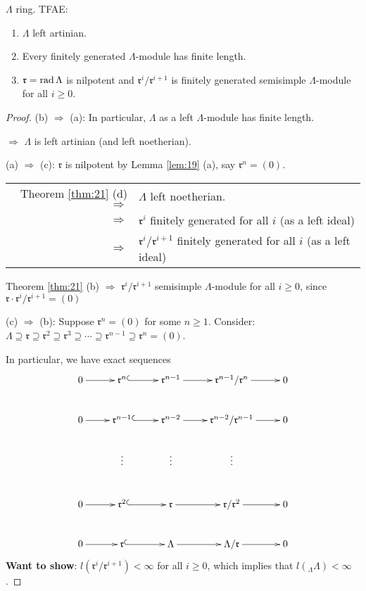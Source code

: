 \begin{cor}\label{cor:22}
$\Lambda$ ring. TFAE:
\begin{enumerate}[\rm(a)]
\item $\Lambda$ left artinian.
\item Every finitely generated $\Lambda$-module has finite length.
\item $\mathfrak{r} = \operatorname{rad}\nolimits\Lambda$ is nilpotent and
  $\mathfrak{r}^i/\mathfrak{r}^{i + 1}$ is finitely generated
  semisimple $\Lambda$-module for all $i\geq 0$. 
\end{enumerate}
\end{cor}
\begin{proof}
(b) $\Rightarrow$ (a): In particular, $\Lambda$ as a left
$\Lambda$-module has finite length. 

$\Rightarrow$ $\Lambda$ is left artinian (and left noetherian). 

(a) $\Rightarrow$ (c):  $\mathfrak{r}$ is nilpotent by Lemma
\ref{lem:19} (a), say $\mathfrak{r}^n = (0)$. 
\begin{center}
\begin{tabular}{rl}
Theorem \ref{thm:21} (d) $\Rightarrow$ & $\Lambda$ left noetherian.\\
$\Rightarrow$ & $\mathfrak{r}^i$ finitely generated for all $i$ (as a
left ideal)\\
$\Rightarrow$ & $\mathfrak{r}^i/\mathfrak{r}^{i+1}$ finitely generated for all $i$ (as a
left ideal)\\
\end{tabular}
\end{center}
Theorem \ref{thm:21} (b) $\Rightarrow$
$\mathfrak{r}^i/\mathfrak{r}^{i+1}$ semisimple $\Lambda$-module for
all $i\geq 0$, since $\mathfrak{r}\cdot \mathfrak{r}^i/\mathfrak{r}^{i+1}=(0)$

(c) $\Rightarrow$ (b):  Suppose $\mathfrak{r}^n = (0)$ for some $n\geq
1$.  Consider: $\Lambda \supseteq \mathfrak{r}\supseteq \mathfrak{r}^2
\supseteq \mathfrak{r}^3\supseteq \cdots \supseteq
\mathfrak{r}^{n-1}\supseteq \mathfrak{r}^n =(0)$.

\label{2017-pages}

In particular, we have exact sequences 
\[\xymatrix{ 
0\ar[r] & \mathfrak{r}^n\ar@{^(->}[r] & \mathfrak{r}^{n-1}\ar[r] &
\mathfrak{r}^{n-1}/\mathfrak{r}^n \ar[r] & 0\\
0\ar[r] & \mathfrak{r}^{n-1}\ar@{^(->}[r] & \mathfrak{r}^{n-2}\ar[r] &
\mathfrak{r}^{n-2}/\mathfrak{r}^{n-1} \ar[r] & 0\\
 & \vdots & \vdots & \vdots & \\
0\ar[r] & \mathfrak{r}^2\ar@{^(->}[r] & \mathfrak{r}\ar[r] &
\mathfrak{r}/\mathfrak{r}^2 \ar[r] & 0\\
0\ar[r] & \mathfrak{r}\ar@{^(->}[r] & \Lambda\ar[r] &
\Lambda/\mathfrak{r} \ar[r] & 0
}\]
\textbf{Want to show}: $l(\mathfrak{r}^i/\mathfrak{r}^{i+1}) < \infty$
for all $i\geq 0$, which implies that $l({_\Lambda\Lambda}) <
\infty$. 


\end{proof}
